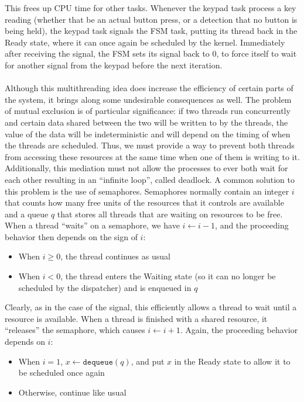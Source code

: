\documentclass[12pt]{report}
\begin{document}
This frees up CPU time for other tasks. Whenever the keypad task process a key reading (whether that
be an actual button press, or a detection that no button is being held), the keypad task signals the
FSM task, putting its thread back in the Ready state, where it can once again be scheduled by the
kernel. Immediately after receiving the signal, the FSM sets its signal back to 0, to force itself
to wait for another signal from the keypad before the next iteration.\\\\
Although this multithreading idea does increase the efficiency of certain parts of the system, it
brings along some undesirable consequences as well. The problem of mutual exclusion is of particular
significance: if two threads run concurrently and certain data shared between the two will be
written to by the threads, the value of the data will be indeterministic and will depend on the
timing of when the threads are scheduled. Thus, we must provide a way to prevent both threads from
accessing these resources at the same time when one of them is writing to it. Additionally, this
mediation must not allow the processes to ever both wait for each other resulting in an ``infinite
loop'', called deadlock. A common solution to this problem is the use of semaphores. Semaphores
normally contain an integer $i$ that counts how many free units of the resources that it controls
are available and a queue $q$ that stores all threads that are waiting on resources to be free. When
a thread ``waits'' on a semaphore, we have $i\leftarrow i-1$, and the proceeding behavior then depends on the
sign of $i$:
\begin{itemize}
	\item When $i\geq 0$, the thread continues as usual
	\item When $i<0$, the thread enters the Waiting state (so it can no longer be scheduled by the
		dispatcher) and is enqueued in $q$
\end{itemize}
Clearly, as in the case of the signal, this efficiently allows a thread to wait until a resource is
available. When a thread is finished with a shared resource, it ``releases'' the semaphore, which
causes $i\leftarrow i+1$. Again, the proceeding behavior depends on $i$:
\begin{itemize}
	\item When $i = 1$, $x\leftarrow\texttt{dequeue}(q)$, and put $x$ in the Ready state to allow it
		to be scheduled once again
	\item Otherwise, continue like usual
\end{itemize}
\end{document}
